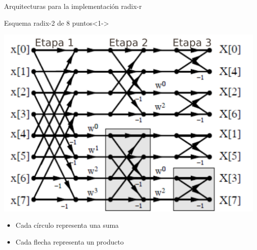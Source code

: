 \begin{frame}{Arquitecturas para la implementación radix-r}
  \begin{block}{Esquema radix-2 de 8 puntos}<1->
     \begin{center}
	  \advance\leftskip-0.2cm
	  \includegraphics[scale=0.42]{./figures/r2_8.png}
    \end{center}
  \end{block}
  
  \begin{itemize}
    \item<2-> Cada círculo representa una suma
    \item<3-> Cada flecha representa un producto
  \end{itemize}
  
\end{frame}

